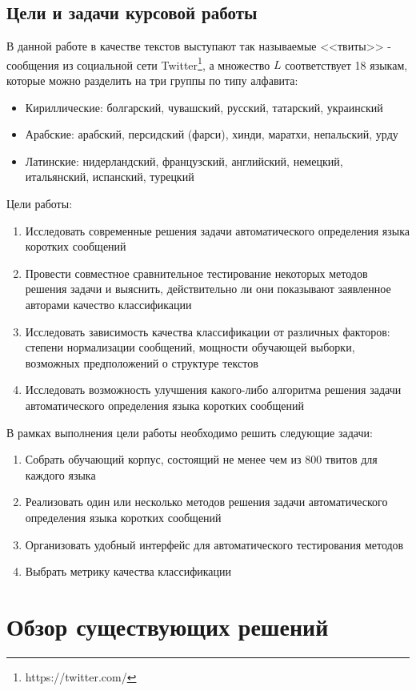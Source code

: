 \documentclass[a4paper, 14pt]{article}
\begin{document}
		\subsection{Цели и задачи курсовой работы}
		В данной работе в качестве текстов выступают так называемые <<твиты>> - сообщения из социальной сети Twitter\footnote{https://twitter.com/}, 
		а множество $L$ соответствует 18
		языкам, которые можно разделить на три группы по типу алфавита:
		\begin{itemize}
			\item Кириллические: болгарский, чувашский, русский, татарский, украинский
			\item Арабские: арабский, персидский (фарси), хинди, маратхи, непальский, урду
			\item Латинские: нидерландский, французский, английский, немецкий, итальянский, испанский, турецкий
		\end{itemize}
		Цели работы:
		\begin{enumerate}
			\item Исследовать современные решения задачи автоматического определения языка коротких сообщений
			\item Провести совместное сравнительное тестирование некоторых методов решения задачи и выяснить, действительно ли они показывают
			заявленное авторами качество классификации
			\item Исследовать зависимость качества классификации от различных факторов: степени нормализации сообщений, мощности обучающей 
			выборки, возможных предположений о структуре текстов
			\item Исследовать возможность улучшения какого-либо алгоритма решения задачи автоматического определения языка коротких сообщений	
		\end{enumerate}
		В рамках выполнения цели работы необходимо решить следующие задачи:
		\begin{enumerate}
			\item Собрать обучающий корпус, состоящий не менее чем из 800 твитов для каждого языка
			\item Реализовать один или несколько методов решения задачи автоматического определения языка коротких сообщений
			\item Организовать удобный интерфейс для автоматического тестирования методов
			\item Выбрать метрику качества классификации
		\end{enumerate}

\section{Обзор существующих решений}
\end{document}
